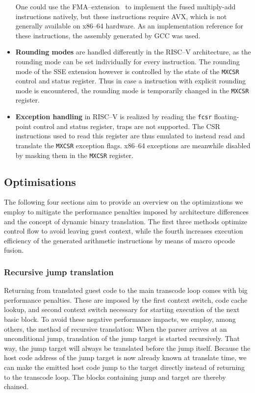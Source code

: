 \begin{itemize}
			One could use the FMA--extension~\cite[S. 141]{intel2017man} to implement the fused multiply-add instructions natively, but these instructions require AVX, which is not generally available on x86--64 hardware.
            As an implementation reference for these instructions, the assembly generated by GCC was used.
    \item \textbf{Rounding modes} are handled differently in the RISC--V architecture, as the rounding mode can be set individually for every instruction.
            The rounding mode of the SSE extension however is controlled by the state of the \texttt{MXCSR} control and status register.
            Thus in case a instruction with explicit rounding mode is encountered, the rounding mode is temporarily changed in the \texttt{MXCSR} register.
    \item \textbf{Exception handling} in RISC--V is realized by reading the \texttt{fcsr} floating-point control and status register, traps are not supported.
            The CSR instructions used to read this register are thus emulated to instead read and translate the \texttt{MXCSR} exception flags.
            x86--64 exceptions are meanwhile disabled by masking them in the \texttt{MXCSR} register.
\end{itemize}


\subsection{Optimisations}
\label{sec:optimise}
The following four sections aim to provide an overview on the optimizations we employ to mitigate the performance penalties imposed by architecture differences and the concept of dynamic binary translation.
The first three methods optimize control flow to avoid leaving guest context, while the fourth increases execution efficiency of the generated arithmetic instructions by means of macro opcode fusion.

\subsubsection{Recursive jump translation}
\label{sec:recursive_translation}
Returning from translated guest code to the main transcode loop comes with big performance penalties.
These are imposed by the first context switch, code cache lookup, and second context switch necessary for starting execution of the next basic block.
To avoid these negative performance impacts, we employ, among others, the method of recursive translation: 
When the parser arrives at an unconditional jump, translation of the jump target is started recursively.
That way, the jump target will always be translated before the jump itself.
Because the host code address of the jump target is now already known at translate time, we can make the emitted host code jump to the target directly instead of returning to the transcode loop.
The blocks containing jump and target are thereby chained.


